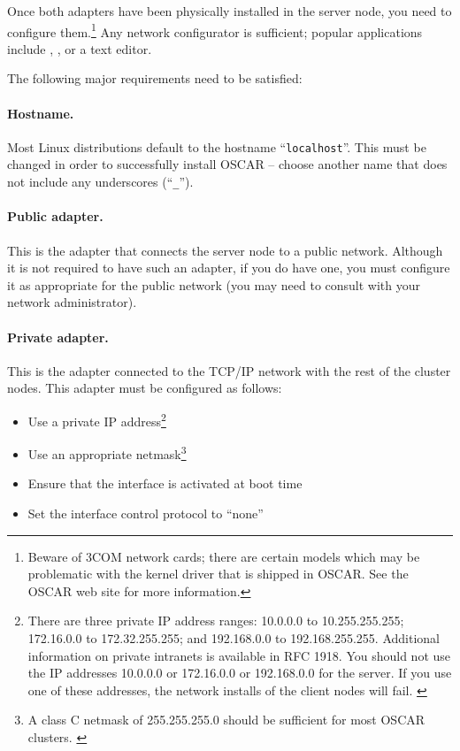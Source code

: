 \begchange

Once both adapters have been physically installed in the server node,
you need to configure them.\footnote{Beware of 3COM network cards;
  there are certain models which may be problematic with the kernel
  driver that is shipped in OSCAR.  See the OSCAR web site for more
  information.}  Any network configurator is sufficient; popular
applications include , , or a text editor.

The following major requirements need to be satisfied:

\paragraph{Hostname.} Most Linux distributions default to the hostname
``{\tt localhost}''.  This must be changed in order to successfully
install OSCAR -- choose another name that does not include any
underscores (``{\tt \_}'').

\paragraph{Public adapter.}  This is the adapter that connects the
server node to a public network.  Although it is not required to have
such an adapter, if you do have one, you must configure it as
appropriate for the public network (you may need to consult with your
network administrator).

\paragraph{Private adapter.}  This is the adapter connected to
the TCP/IP network with the rest of the cluster nodes.  This adapter
must be configured as follows:

\begin{itemize}
\item Use a private IP address\footnote{There are three private IP
    address ranges: 10.0.0.0 to 10.255.255.255; 172.16.0.0 to
    172.32.255.255; and 192.168.0.0 to 192.168.255.255.  Additional
    information on private intranets is available in RFC 1918.  You
    should not use the IP addresses 10.0.0.0 or 172.16.0.0 or
    192.168.0.0 for the server.  If you use one of these addresses,
    the network installs of the client nodes will fail.
    \label{foot:private-ip-ranges}}

\item Use an appropriate netmask\footnote{A class C netmask of
    255.255.255.0 should be sufficient for most OSCAR clusters.
    \label{foot:netmask}} 

\item Ensure that the interface is activated at boot time

\item Set the interface control protocol to ``none''

\end{itemize}

